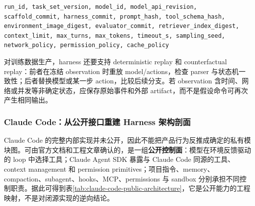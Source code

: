\documentclass[10pt,a4paper,UTF8,fontset=none]{ctexart}
\begin{document}
\begin{lstlisting}[style=codeblock,caption={Harness run manifest 的最小复现信息},label={lst:harness-manifest}]
run_id, task_set_version, model_id, model_api_revision,
scaffold_commit, harness_commit, prompt_hash, tool_schema_hash,
environment_image_digest, evaluator_commit, retriever_index_digest,
context_limit, max_turns, max_tokens, timeout_s, sampling_seed,
network_policy, permission_policy, cache_policy
\end{lstlisting}

对训练数据生产，harness 还要支持 deterministic replay 和 counterfactual replay：前者在冻结 observation 时重放 model/actions，检查 parser 与状态机一致性；后者替换模型或某一步 action，比较后续分支。若 observation 含时间、网络或并发等非确定状态，应保存原始事件和外部 artifact，而不是假设命令可再次产生相同输出。

\subsubsection{Claude Code：从公开接口重建 Harness 架构剖面}

Claude Code 的完整内部实现并未公开，因此不能把产品行为反推成确定的私有模块图。可由官方文档和工程文章确认的，是一组\textbf{公开控制面}：模型在环境反馈驱动的 loop 中选择工具；Claude Agent SDK 暴露与 Claude Code 同源的工具、context management 和 permission primitives；项目指令、memory、compaction、subagent、hooks、MCP、permissions 与 sandbox 分别承担不同控制职责\cite{anthropic2024agents,anthropic2025bestpractices,anthropic2025autonomy}。据此可得到表\ref{tab:claude-code-public-architecture}，它是公开能力的工程映射，不是对闭源实现的逆向结论。
\end{document}
